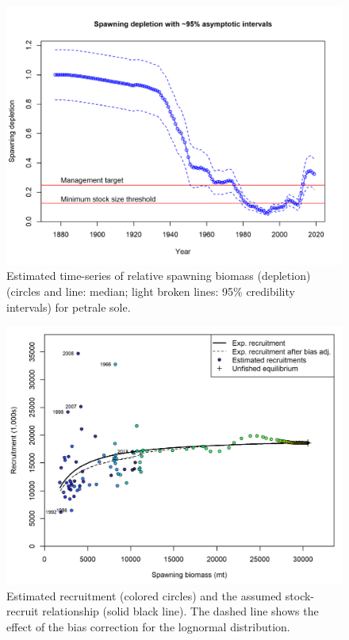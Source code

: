 \documentclass[12pt,]{article}
\begin{document}
\FloatBarrier

\begin{figure}
\centering
\includegraphics{r4ss/plots_mod1/ts9_Spawning_depletion_with_95_asymptotic_intervals_intervals.png}
\caption{Estimated time-series of relative spawning biomass (depletion)
(circles and line: median; light broken lines: 95\% credibility
intervals) for petrale sole. \label{fig:depl}}
\end{figure}

\FloatBarrier

\begin{figure}
\centering
\includegraphics{r4ss/plots_mod1/SR_curve2.png}
\caption{Estimated recruitment (colored circles) and the assumed
stock-recruit relationship (solid black line). The dashed line shows the
effect of the bias correction for the lognormal distribution.
\label{fig:stock_recruit_curve}}
\end{figure}
\end{document}
